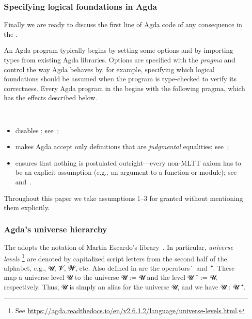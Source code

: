\subsubsection{Specifying logical foundations in Agda}\label{sec:preliminaries}
Finally we are ready to discuss the first line of Agda code of any consequence in the \ualib. 

An Agda program typically begins by setting some options and by importing types from existing Agda libraries.
Options are specified with the  \emph{pragma} and control the way Agda behaves by, for example, specifying which logical foundations should be assumed when the program is type-checked to verify its correctness. 
Every Agda program in the \ualib begins with the following pragma, which has the effects described below.
\ccpad
\begin{code}[number=code:options]
\>[0]\AgdaSymbol{\{-\#}\AgdaSpace{}%
\AgdaSpace{}%
\AgdaSpace{}%
\AgdaSpace{}%
\AgdaSpace{}%
\AgdaSymbol{\#-\}}\<%
\end{code}
\\[-20pt]
\begin{itemize}
\item {} disables \axiomk; see~\cite{agdaref-axiomk};
\item {} makes Agda accept only definitions that are \emph{judgmental} equalities; see~\cite{agdatools-patternmatching};
\item {} ensures that nothing is postulated outright---every non-MLTT axiom has to be an explicit assumption (e.g., an argument to a function or module); see~\cite{agdaref-safeagda} and~\cite{agdatools-patternmatching}.
\end{itemize}
Throughout this paper we take assumptions 1--3 for granted without mentioning them explicitly.



\subsubsection{Agda's universe hierarchy}\label{ssec:agdas-universe-hierarchy}
The \agdaualib adopts the notation of Martin Escardo's \typetopology library~\cite{MHE}. In particular, \emph{universe levels}%
\footnote{See \url{https://agda.readthedocs.io/en/v2.6.1.2/language/universe-levels.html}.}
are denoted by capitalized script letters from the second half of the alphabet, e.g., \ab 𝓤, \ab 𝓥, \ab 𝓦, etc.  Also defined in \typetopology are the operators~\af ̇~and~\af ⁺. These map a universe level \ab 𝓤 to the universe \ab 𝓤\af ̇ := \Set \ab 𝓤 and the level \ab 𝓤 \af ⁺ \aod := \lsuc \ab 𝓤, respectively.  Thus, \ab 𝓤\af ̇ is simply an alias for the universe \Set \ab 𝓤, and we have \ab 𝓤\af ̇ \as : \ab 𝓤 \af ⁺\af ̇.

